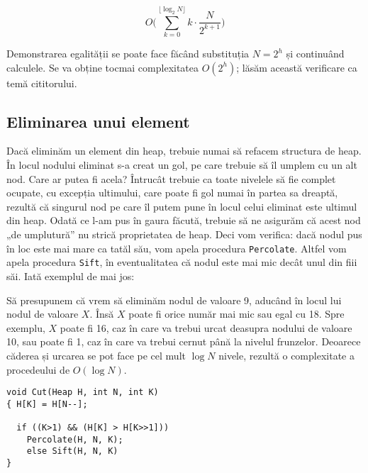 \begin{equation}
  O \biggl( \sum_{k = 0}^{\lfloor \log_2 N \rfloor} k \cdot \frac{N}{2^{k + 1}} \biggr)
\end{equation}

Demonstrarea egalității se poate face făcând substituția $N=2^h$ și continuând
calculele. Se va obține tocmai complexitatea $O(2^h)$; lăsăm această
verificare ca temă cititorului.

\subsection{Eliminarea unui element}

Dacă eliminăm un element din heap, trebuie numai să refacem structura de
heap. În locul nodului eliminat s-a creat un gol, pe care trebuie să îl umplem
cu un alt nod. Care ar putea fi acela? Întrucât trebuie ca toate nivelele să
fie complet ocupate, cu excepția ultimului, care poate fi gol numai în partea
sa dreaptă, rezultă că singurul nod pe care îl putem pune în locul celui
eliminat este ultimul din heap. Odată ce l-am pus în gaura făcută, trebuie să
ne asigurăm că acest nod „de umplutură” nu strică proprietatea de heap. Deci
vom verifica: dacă nodul pus în loc este mai mare ca tatăl său, vom apela
procedura {\tt Percolate}. Altfel vom apela procedura {\tt Sift}, în
eventualitatea că nodul este mai mic decât unul din fiii săi. Iată exemplul de
mai jos:


Să presupunem că vrem să eliminăm nodul de valoare 9, aducând în locul lui
nodul de valoare $X$. Însă $X$ poate fi orice număr mai mic sau egal cu
18. Spre exemplu, $X$ poate fi 16, caz în care va trebui urcat deasupra
nodului de valoare 10, sau poate fi 1, caz în care va trebui cernut până la
nivelul frunzelor. Deoarece căderea și urcarea se pot face pe cel mult $\log
N$ nivele, rezultă o complexitate a procedeului de $O(\log N)$.

\begin{verbatim}
void Cut(Heap H, int N, int K)
{ H[K] = H[N--];

  if ((K>1) && (H[K] > H[K>>1]))
    Percolate(H, N, K);
    else Sift(H, N, K)
}
\end{verbatim}

